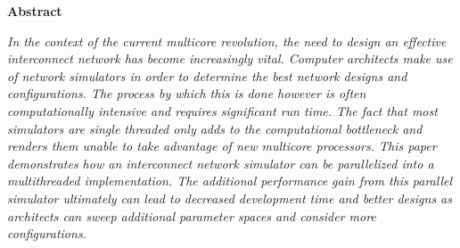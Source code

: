 \documentclass{article}
\begin{document}
\begin{multicols}{2}
\begin{center}
\Large{\bf Abstract}
\end{center}
\emph{In the context of the current multicore revolution, the need to
design an effective interconnect network has become increasingly
vital.  Computer architects make use of network simulators in order to
determine the best network designs and configurations.  The process by which this
is done however is often computationally intensive and requires
significant run time.  The fact that most simulators are single threaded
only adds to the computational bottleneck and renders them unable to take
advantage of new multicore processors.  This paper demonstrates how
an interconnect network simulator can be parallelized into a multithreaded
implementation.  The additional
performance gain from this parallel simulator ultimately can lead to decreased
development time and better designs as architects can sweep additional
parameter spaces and consider more configurations.}

\end{multicols}
\end{document}
